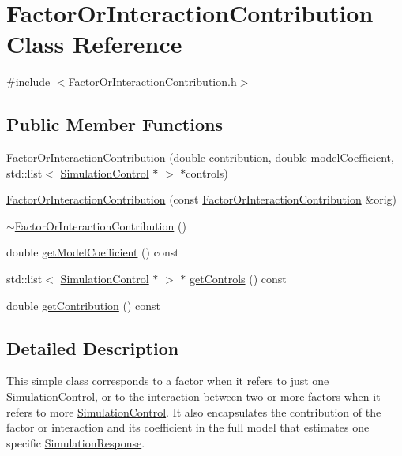 \hypertarget{class_factor_or_interaction_contribution}{\section{Factor\-Or\-Interaction\-Contribution Class Reference}
\label{class_factor_or_interaction_contribution}
}


{\ttfamily \#include $<$Factor\-Or\-Interaction\-Contribution.\-h$>$}

\subsection*{Public Member Functions}
\begin{DoxyCompactItemize}
\item 
\hyperlink{class_factor_or_interaction_contribution_aee33d23a9255292a4c9e7bb7c1b02e2d}{Factor\-Or\-Interaction\-Contribution} (double contribution, double model\-Coefficient, std\-::list$<$ \hyperlink{class_simulation_control}{Simulation\-Control} $\ast$ $>$ $\ast$controls)
\item 
\hyperlink{class_factor_or_interaction_contribution_a6c3335e47b137605f7258ceb6233be3a}{Factor\-Or\-Interaction\-Contribution} (const \hyperlink{class_factor_or_interaction_contribution}{Factor\-Or\-Interaction\-Contribution} \&orig)
\item 
\hyperlink{class_factor_or_interaction_contribution_ae9efdcdc1f162a045fc7b4bff3abf7b7}{$\sim$\-Factor\-Or\-Interaction\-Contribution} ()
\item 
double \hyperlink{class_factor_or_interaction_contribution_af1d9b3083c6176a1ac96f6abfa476c3c}{get\-Model\-Coefficient} () const 
\item 
std\-::list$<$ \hyperlink{class_simulation_control}{Simulation\-Control} $\ast$ $>$ $\ast$ \hyperlink{class_factor_or_interaction_contribution_a12556ece8eb1b2e9c31186571cabfea4}{get\-Controls} () const 
\item 
double \hyperlink{class_factor_or_interaction_contribution_ad0113b8462ffdf1040fe43f5f4f25e4a}{get\-Contribution} () const 
\end{DoxyCompactItemize}


\subsection{Detailed Description}
This simple class corresponds to a factor when it refers to just one \hyperlink{class_simulation_control}{Simulation\-Control}, or to the interaction between two or more factors when it refers to more \hyperlink{class_simulation_control}{Simulation\-Control}. It also encapsulates the contribution of the factor or interaction and its coefficient in the full model that estimates one specific \hyperlink{class_simulation_response}{Simulation\-Response}. 

